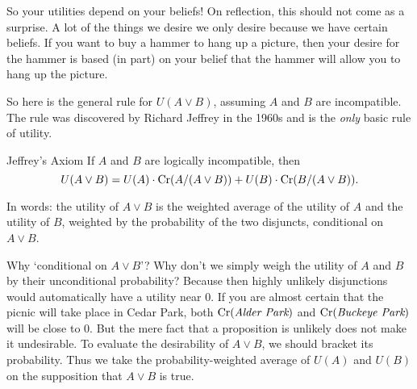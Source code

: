 So your utilities depend on your beliefs! On reflection, this should
not come as a surprise. A lot of the things we desire we only desire
because we have certain beliefs. If you want to buy a hammer to hang
up a picture, then your desire for the hammer is based (in part) on your belief
that the hammer will allow you to hang up the picture. 


So here is the general rule for $U(A \lor B)$, assuming $A$ and $B$
are incompatible. The rule was discovered by Richard Jeffrey in the
1960s and is the \emph{only} basic rule of utility.
\newpage
%
\begin{genericthm}{Jeffrey's Axiom}
  If $A$ and $B$ are logically incompatible, then 
  \[ U(A \lor B) =
  U(A)\cdot \text{Cr}(A/(A\lor B)) + U(B)\cdot \text{Cr}(B/(A \lor B)). \]
\end{genericthm}
%
In words: the utility of $A \lor B$ is the weighted average of the
utility of $A$ and the utility of $B$, weighted by the probability of
the two disjuncts, conditional on $A \lor B$.

Why `conditional on $A \lor B$'? Why don't we simply weigh the utility
of $A$ and $B$ by their unconditional probability? Because then highly
unlikely disjunctions would automatically have a utility near 0. If
you are almost certain that the picnic will take place in Cedar Park,
both $\text{Cr}(\emph{Alder Park})$ and $\text{Cr}(\emph{Buckeye Park})$ will be
close to 0. But the mere fact that a proposition is unlikely does
not make it undesirable. To evaluate the desirability of $A \lor B$,
we should bracket its probability. Thus we take the
probability-weighted average of $U(A)$ and $U(B)$ on the supposition
that $A \lor B$ is true.

